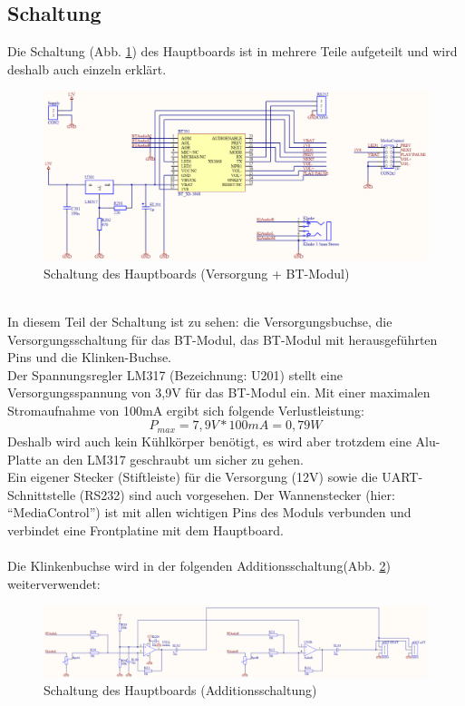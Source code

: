 \subsection{Schaltung}
Die Schaltung (Abb. \ref{fig:abb3.3}) des Hauptboards ist in mehrere Teile aufgeteilt und wird deshalb auch einzeln erklärt.
\begin{figure} [h]
	\centering
	\caption{Schaltung des Hauptboards (Versorgung + BT-Modul)}
	\label {fig:abb3.3}
	\includegraphics[width=1\textwidth]{schaltungen/hauptboard_sch1.png}
\end{figure} \\
In diesem Teil der Schaltung ist zu sehen: die Versorgungsbuchse, die Versorgungsschaltung für das BT-Modul, das BT-Modul mit herausgeführten Pins und die Klinken-Buchse.\\
Der Spannungsregler LM317 (Bezeichnung: U201) stellt eine Versorgungsspannung von 3,9V für das BT-Modul ein. Mit einer maximalen Stromaufnahme von 100mA ergibt sich folgende Verlustleistung:
\begin{equation}
	P_{max} = 7,9V * 100mA = 0,79W
\end{equation}
Deshalb wird auch kein Kühlkörper benötigt, es wird aber trotzdem eine Alu-Platte an den LM317 geschraubt um sicher zu gehen. \\
Ein eigener Stecker (Stiftleiste) für die Versorgung (12V) sowie die UART-Schnittstelle (RS232) sind auch vorgesehen. Der Wannenstecker (hier: \enquote{MediaControl}) ist mit allen wichtigen Pins des Moduls verbunden und verbindet eine Frontplatine mit dem Hauptboard. \\ \\
Die Klinkenbuchse wird in der folgenden Additionsschaltung(Abb. \ref {fig:abb3.4}) weiterverwendet:
\begin{figure} [h]
	\centering
	\caption{Schaltung des Hauptboards (Additionsschaltung)}
	\label {fig:abb3.4}
	\includegraphics[width=1\textwidth]{schaltungen/hauptboard_sch2.png}
\end{figure} \\
